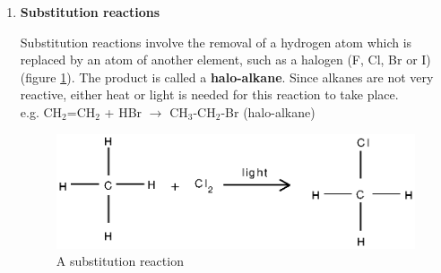 \begin{enumerate}
\item{\textbf{Substitution reactions}

Substitution reactions involve the removal of a hydrogen atom which is replaced by an atom of another element, such as a halogen (F, Cl, Br or I) (figure \ref{fig:organic:substitution}). The product is called a \textbf{halo-alkane}. Since alkanes are not very reactive, either heat or light is needed for this reaction to take place.\\

e.g. CH$_{2}$=CH$_{2}$ + HBr \rm${\rightarrow}$ CH$_{3}$-CH$_{2}$-Br (halo-alkane)

\begin{figure}[h]

\begin{center}
 \includegraphics{../../epsimages/substitution_rxn.eps}
\end{center}


\caption{A substitution reaction}
\label{fig:organic:substitution}
\end{figure}
}


\end{enumerate}
